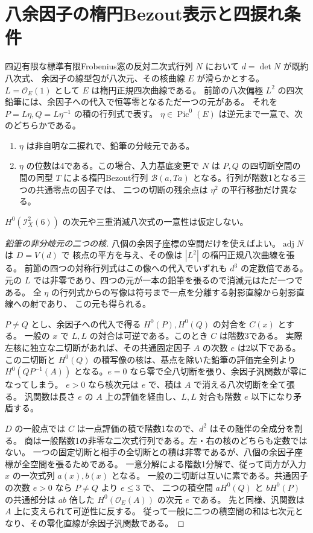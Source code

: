 \section{八余因子の楕円Bezout表示と四捩れ条件}
\label{sec:elliptic-bezout-torsion}
\begin{theorem}\label{thm:elliptic-bezout-torsion}
四辺有限な標準有限Frobenius窓の反対二次式行列 $N$ において $d=\det N$ が既約八次式、
余因子の線型包が八次元、その核曲線 $E$ が滑らかとする。
$L=\mathcal O_E(1)$ として $E$ は楕円正規四次曲線である。
前節の八次偏極 $L^2$ の四次鉛筆には、余因子への代入で恒等零となるただ一つの元がある。
それを $P=L\eta,Q=L\eta^{-1}$ の積の行列式で表す。
$\eta\in\operatorname{Pic}^0(E)$ は逆元まで一意で、次のどちらかである。
\begin{enumerate}
\item $\eta$ は非自明な二捩れで、鉛筆の分岐元である。
\item $\eta$ の位数は4である。この場合、入力基底変更で $N$ は
$P,Q$ の四切断空間の間の同型 $T$ による楕円Bezout行列
$\mathcal B(a,Ta)$ となる。行列が階数1となる三つの共通零点の因子では、
二つの切断の残余点は $\eta^2$ の平行移動だけ異なる。
\end{enumerate}
$H^0(\mathcal I_X^2(6))$ の次元や三重消滅八次式の一意性は仮定しない。
\end{theorem}
\begin{proof}[鉛筆の非分岐元の二つの核]
八個の余因子座標の空間だけを使えばよい。$\operatorname{adj}N$ は $D=V(d)$ で
核点の平方を与え、その像は $|L^2|$ の楕円正規八次曲線を張る。
前節の四つの対称行列式はこの像への代入でいずれも $d^3$ の定数倍である。
元の $L$ では非零であり、四つの元が一本の鉛筆を張るので消滅元はただ一つである。
全 $\eta$ の行列式からの写像は符号まで一点を分離する射影直線から射影直線への射であり、
この元も得られる。

$P\ne Q$ とし、余因子への代入で得る $H^0(P),H^0(Q)$ の対合を $C(x)$ とする。
一般の $x$ で $L,L$ の対合は可逆である。このとき $C$ は階数3である。
実際左核に独立な二切断があれば、その共通固定因子 $A$ の次数 $e$ は2以下である。
この二切断と $H^0(Q)$ の積写像の核は、基点を除いた鉛筆の評価完全列より
$H^0(QP^{-1}(A))$ となる。$e=0$ なら零で全八切断を張り、余因子汎関数が零になってしまう。
$e>0$ なら核次元は $e$ で、積は $A$ で消える八次切断を全て張る。
汎関数は長さ $e$ の $A$ 上の評価を経由し、$L,L$ 対合も階数 $e$ 以下になり矛盾する。

$D$ の一般点では $C$ は一点評価の積で階数1なので、$d^2$ はその随伴の全成分を割る。
商は一般階数1の非零な二次式行列である。左・右の核のどちらも定数ではない。
一つの固定切断と相手の全切断との積は非零であるが、八個の余因子座標が全空間を張るためである。
一意分解による階数1分解で、従って両方が入力 $x$ の一次式列 $a(x),b(x)$ となる。
一般の二切断は互いに素である。共通因子の次数 $e>0$ なら $P\ne Q$ より $e\le3$ で、
二つの積空間 $aH^0(Q)$ と $bH^0(P)$ の共通部分は
$ab$ 倍した $H^0(\mathcal O_E(A))$ の次元 $e$ である。
先と同様、汎関数は $A$ 上に支えられて可逆性に反する。
従って一般に二つの積空間の和は七次元となり、その零化直線が余因子汎関数である。
\end{proof}

